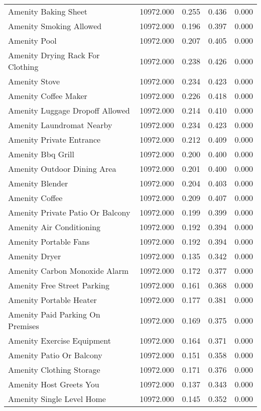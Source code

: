 \begin{tabular}{lllll}
Amenity Baking Sheet & 10972.000 & 0.255 & 0.436 & 0.000 \\
Amenity Smoking Allowed & 10972.000 & 0.196 & 0.397 & 0.000 \\
Amenity Pool & 10972.000 & 0.207 & 0.405 & 0.000 \\
Amenity Drying Rack For Clothing & 10972.000 & 0.238 & 0.426 & 0.000 \\
Amenity Stove & 10972.000 & 0.234 & 0.423 & 0.000 \\
Amenity Coffee Maker & 10972.000 & 0.226 & 0.418 & 0.000 \\
Amenity Luggage Dropoff Allowed & 10972.000 & 0.214 & 0.410 & 0.000 \\
Amenity Laundromat Nearby & 10972.000 & 0.234 & 0.423 & 0.000 \\
Amenity Private Entrance & 10972.000 & 0.212 & 0.409 & 0.000 \\
Amenity Bbq Grill & 10972.000 & 0.200 & 0.400 & 0.000 \\
Amenity Outdoor Dining Area & 10972.000 & 0.201 & 0.400 & 0.000 \\
Amenity Blender & 10972.000 & 0.204 & 0.403 & 0.000 \\
Amenity Coffee & 10972.000 & 0.209 & 0.407 & 0.000 \\
Amenity Private Patio Or Balcony & 10972.000 & 0.199 & 0.399 & 0.000 \\
Amenity Air Conditioning & 10972.000 & 0.192 & 0.394 & 0.000 \\
Amenity Portable Fans & 10972.000 & 0.192 & 0.394 & 0.000 \\
Amenity Dryer & 10972.000 & 0.135 & 0.342 & 0.000 \\
Amenity Carbon Monoxide Alarm & 10972.000 & 0.172 & 0.377 & 0.000 \\
Amenity Free Street Parking & 10972.000 & 0.161 & 0.368 & 0.000 \\
Amenity Portable Heater & 10972.000 & 0.177 & 0.381 & 0.000 \\
Amenity Paid Parking On Premises & 10972.000 & 0.169 & 0.375 & 0.000 \\
Amenity Exercise Equipment & 10972.000 & 0.164 & 0.371 & 0.000 \\
Amenity Patio Or Balcony & 10972.000 & 0.151 & 0.358 & 0.000 \\
Amenity Clothing Storage & 10972.000 & 0.171 & 0.376 & 0.000 \\
Amenity Host Greets You & 10972.000 & 0.137 & 0.343 & 0.000 \\
Amenity Single Level Home & 10972.000 & 0.145 & 0.352 & 0.000 \\

\end{tabular}
